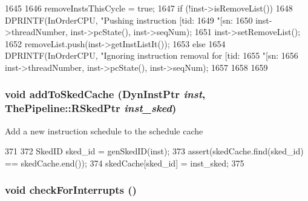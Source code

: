 \begin{DoxyCode}
1645 {
1646     removeInstsThisCycle = true;
1647     if (!inst->isRemoveList()) {            
1648         DPRINTF(InOrderCPU, "Pushing instruction [tid:%
1649                 "[sn:%
1650                 inst->threadNumber, inst->pcState(), inst->seqNum);
1651         inst->setRemoveList();        
1652         removeList.push(inst->getInstListIt());
1653     }  else {
1654         DPRINTF(InOrderCPU, "Ignoring instruction removal for [tid:%
1655                 "[sn:%
1656                 inst->threadNumber, inst->pcState(), inst->seqNum);
1657     }
1658     
1659 }
\end{DoxyCode}
\hypertarget{classInOrderCPU_a51ed27cba133db18c3a632cf6f04a56e}{
\subsubsection[{addToSkedCache}]{\setlength{\rightskip}{0pt plus 5cm}void addToSkedCache ({\bf DynInstPtr} {\em inst}, \/  {\bf ThePipeline::RSkedPtr} {\em inst\_\-sked})}}
\label{classInOrderCPU_a51ed27cba133db18c3a632cf6f04a56e}
Add a new instruction schedule to the schedule cache 


\begin{DoxyCode}
371     {
372         SkedID sked_id = genSkedID(inst);
373         assert(skedCache.find(sked_id) == skedCache.end());
374         skedCache[sked_id] = inst_sked;
375     }
\end{DoxyCode}
\hypertarget{classInOrderCPU_afc6b0526014df091373ec2c850508a55}{
\subsubsection[{checkForInterrupts}]{\setlength{\rightskip}{0pt plus 5cm}void checkForInterrupts ()}}
\label{classInOrderCPU_afc6b0526014df091373ec2c850508a55}



